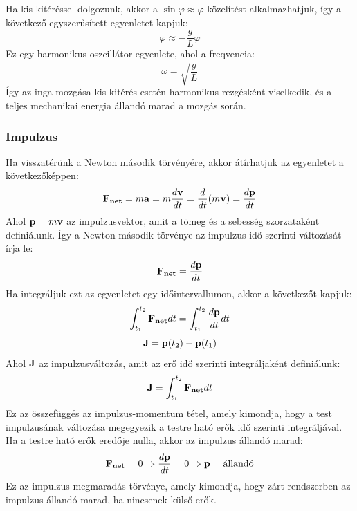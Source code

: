 \documentclass[../main.tex]{subfiles}
\begin{document}
Ha kis kitéréssel dolgozunk, akkor a $\sin\varphi \approx \varphi$ közelítést alkalmazhatjuk, így a következő egyszerűsített egyenletet kapjuk:
\begin{equation}
    \ddot{\varphi} \approx -\frac{g}{L} \varphi
\end{equation}
Ez egy harmonikus oszcillátor egyenlete, ahol a freqvencia:
\begin{equation}
    \omega = \sqrt{\frac{g}{L}}
\end{equation}
Így az inga mozgása kis kitérés esetén harmonikus rezgésként viselkedik, és a teljes mechanikai energia állandó marad a mozgás során.

\subsubsection{Impulzus}
Ha visszatérünk a Newton második törvényére, akkor átírhatjuk az egyenletet a következőképpen:
\begin{equation}
    \bold{F_{net}} = m\bold{a} = m\frac{d\bold{v}}{dt} = \frac{d}{dt}(m\bold{v}) = \frac{d\bold{p}}{dt}
\end{equation}
Ahol $\bold{p} = m\bold{v}$ az impulzusvektor, amit a tömeg és a sebesség szorzataként definiálunk. Így a Newton második törvénye az impulzus idő szerinti változását írja le:
\begin{equation}
    \bold{F_{net}} = \frac{d\bold{p}}{dt}
\end{equation}
Ha integráljuk ezt az egyenletet egy időintervallumon, akkor a következőt kapjuk:
\begin{equation}
    \int_{t_1}^{t_2} \bold{F_{net}} dt = \int_{t_1}^{t_2} \frac{d\bold{p}}{dt} dt
\end{equation}
\begin{equation}
    \bold{J} = \bold{p}(t_2) - \bold{p}(t_1)
\end{equation}
Ahol $\bold{J}$ az impulzusváltozás, amit az erő idő szerinti integráljaként definiálunk:
\begin{equation}
    \bold{J} = \int_{t_1}^{t_2} \bold{F_{net}} dt
\end{equation}
Ez az összefüggés az impulzus-momentum tétel, amely kimondja, hogy a test impulzusának változása megegyezik a testre ható erők idő szerinti integráljával. Ha a testre ható erők eredője nulla, akkor az impulzus állandó marad:
\begin{equation}
    \bold{F_{net}} = 0 \Rightarrow \frac{d\bold{p}}{dt} = 0 \Rightarrow \bold{p} = \text{állandó}
\end{equation}
Ez az impulzus megmaradás törvénye, amely kimondja, hogy zárt rendszerben az impulzus állandó marad, ha nincsenek külső erők.
\end{document}
